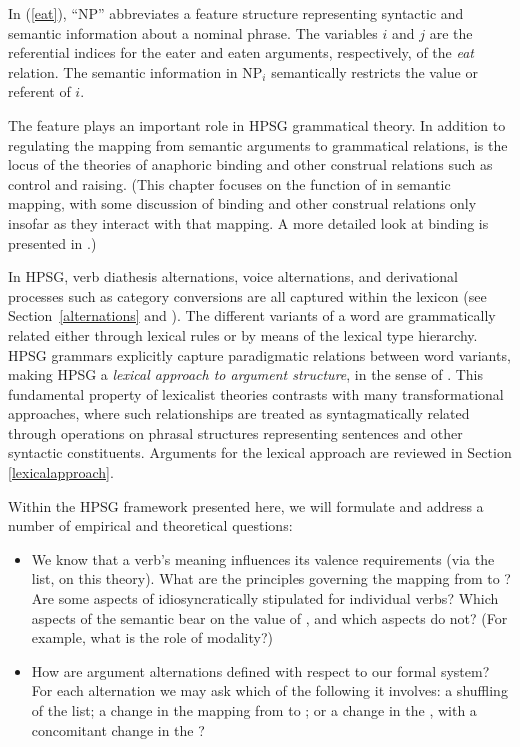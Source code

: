 \documentclass[output=paper
                ,modfonts
                ,nonflat
	        ,collection
	        ,collectionchapter
	        ,collectiontoclongg
 	        ,biblatex
                ,babelshorthands
                ,newtxmath
                ,draftmode
                ,colorlinks, citecolor=brown
]{./langsci/langscibook}
\begin{document}
	
\noindent
In (\ref{eat}), ``NP'' abbreviates a feature structure representing syntactic and semantic information about a nominal phrase.  The variables $i$ and 
$j$ are the referential indices for the eater and eaten arguments, respectively, of the \textit{eat} relation.  The semantic information in 
NP$_i$ semantically restricts the value or referent of $i$. 

The \argst feature plays an important  
role in HPSG grammatical theory.  In addition to regulating the mapping from semantic arguments to grammatical relations, \argst is the locus of the theories of anaphoric binding and other construal relations such as control and raising.  (This chapter focuses on the function of \argst  in semantic mapping, with some discussion of binding and other construal relations only insofar as they interact with that mapping.  A more detailed look at binding is presented in .)   

In HPSG, verb diathesis alternations, voice alternations, and derivational processes such as category conversions are all captured within the lexicon (see Section~\ref{alternations} and ).  The different variants of a word are grammatically related either through lexical rules or by means of the lexical type hierarchy.  HPSG grammars explicitly capture paradigmatic relations between word variants, making HPSG a \textit{lexical approach to argument structure}, in the sense of \citet{MWArgSt}.
This fundamental property of lexicalist theories contrasts with many transformational approaches, where such relationships are treated as syntagmatically related through operations on phrasal structures representing sentences and other syntactic constituents.  Arguments for the lexical approach are reviewed in Section \ref{lexicalapproach}.  

Within the HPSG framework presented here, we will formulate and address a number of empirical and theoretical questions: 

\begin{itemize}
\item We know that a verb's meaning influences its valence requirements (via the \argst list, on this theory). 
 What are the principles governing the mapping from \content to \argst ?  Are some aspects of \argst idiosyncratically stipulated for individual verbs?  Which aspects of the semantic \content  bear on the value of \argst, and which aspects do not?  (For example, what is the role of modality?)  
\item How are argument alternations defined with respect to our formal system?  For each alternation we may ask which of the following it involves: a shuffling of the \argst list;  a change in the mapping from \argst to \val; or  a change in the \content, with a concomitant change in the \argst?  
\end{itemize}
\end{document}
